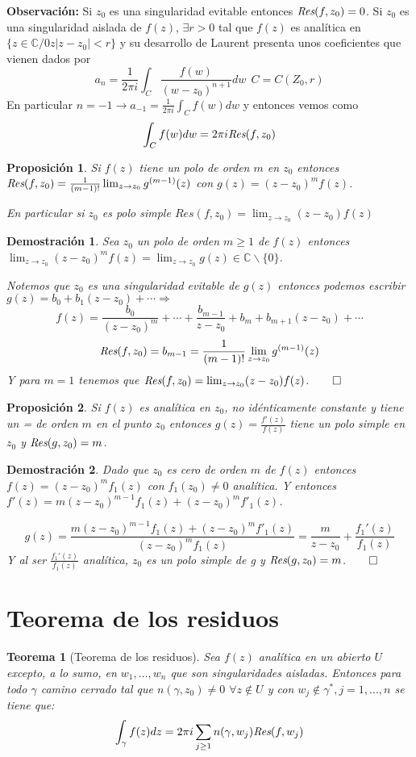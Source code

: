 \documentclass[10pt]{book}
\newtheorem{theorem}{Teorema}[chapter]
\newtheorem{prop}{Proposición}[chapter]
\newtheorem*{dem}{Demostración}
\newcommand{\C}{\mathbb{C}}
\newcommand{\Res}{\emph{Res}}
\begin{document}
\textbf{Observación:} Si $z_0$ es una singularidad evitable entonces $\Res(f,z_0) =0$. 
Si $z_0$ es una singularidad aislada de $f(z)$, $\exists r>0$ tal que $f(z)$ es analítica en $\{z\in\C / 0z|z-z_0|<r\}$ y su desarrollo de Laurent presenta unos coeficientes que vienen dados por 
$$
a_n = \frac{1}{2\pi i}\int_C \frac{f(w)}{(w-z_0)^{n+1}}dw\ \ C= C(Z_0,r)
$$
En particular $n=-1 \longrightarrow a_{-1} = \frac{1}{2\pi i}\int_C f(w)dw$ y entonces vemos como
$$\int_C f(w)dw = 2\pi i \Res(f,z_0)$$

\begin{prop}
Si $f(z)$ tiene un  polo de orden $m$ en $z_0$ entonces $\Res(f,z_0)= \frac{1}{(m-1)!}\lim_{z\to z_0}g^{(m-1)}(z)$ con $g(z) = (z-z_0)^mf(z)$.

En particular si $z_0$ es polo simple $Res(f,z_0) = \lim_{z\to z_0} (z-z_0)f(z)$
\end{prop}

\begin{dem}
Sea $z_0$ un polo de orden $m\geq 1$ de $f(z)$ entonces $\lim_{z\to z_0}(z-z_0)^m f(z) = \lim_{z\to z_0} g(z) \in \C\backslash\{0\}$.

Notemos que $z_0$ es una singularidad evitable de $g(z)$ entonces podemos escribir $g(z) = b_0 + b_1(z-z_0) + \cdots \Rightarrow$
$$f(z) = \frac{b_0}{(z-z_0)^m}+ \cdots + \frac{b_{m-1}}{z-z_0}+ b_m + b_{m+1}(z-z_0) + \cdots$$
$$\Res(f,z_0) = b_{m-1} = \frac{1}{(m-1)!}\lim_{z\to z_0} g^{(m-1)}(z)$$
Y para $m =1$ tenemos que $\Res(f,z_0) = \lim_{z\to z_0} (z-z_0)f(z)$.$\qed$
\end{dem}


\begin{prop}
Si $f(z)$ es analítica en $z_0$, no idénticamente constante y tiene un = de orden $m$ en el punto $z_0$ entonces $g(z) =  \frac{f'(z)}{f(z)}$ tiene un polo simple en $z_0$ y $\Res(g,z_0) = m$.
\end{prop}

\begin{dem}
Dado que $z_0$ es cero de orden $m$ de $f(z)$ entonces $f(z) = (z-z_0)^mf_1(z)$ con $f_1(z_0)\neq 0$ analítica.
Y entonces $f'(z)  = m(z-z_0)^{m-1}f_1(z) + (z-z_0)^mf'_1(z)$.

$$g(z) = \frac{m(z-z_0)^{m-1}f_1(z) + (z-z_0)^mf'_1(z)}{(z-z_0)^mf_1(z)} = \frac{m}{z-z_0}+\frac{f_1'(z)}{f_1(z)}$$
Y al ser $\frac{f_1'(z)}{f_1(z)}$ analítica, $z_0$ es un polo simple de g y $\Res(g,z_0) = m$.$\qed$
\end{dem}
\section{Teorema de los residuos}
\begin{theorem}[Teorema de los residuos]
Sea $f(z)$ analítica en un abierto $U$ excepto, a lo sumo, en $w_1,\ldots,w_n$ que son singularidades aisladas. Entonces para todo $\gamma$ camino cerrado tal que $n(\gamma,z_0) \neq 0$ $\forall z\notin U$ y con $w_j \notin \gamma^*, j= 1,\ldots,n$ se tiene que:
$$\int_\gamma f(z)dz = 2\pi i \sum_{j\geq 1} n(\gamma,w_j) \Res(f,w_j)$$
\end{theorem}
\end{document}
